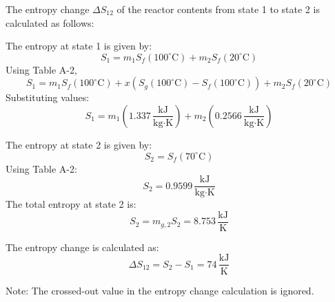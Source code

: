 The entropy change \( \Delta S_{12} \) of the reactor contents from state 1 to state 2 is calculated as follows:

The entropy at state 1 is given by:  
\[
S_1 = m_1 S_f(100^\circ\text{C}) + m_2 S_f(20^\circ\text{C})
\]  
Using Table A-2,  
\[
S_1 = m_1 S_f(100^\circ\text{C}) + x(S_g(100^\circ\text{C}) - S_f(100^\circ\text{C})) + m_2 S_f(20^\circ\text{C})
\]  
Substituting values:  
\[
S_1 = m_1 (1.337 \, \frac{\text{kJ}}{\text{kg·K}}) + m_2 (0.2566 \, \frac{\text{kJ}}{\text{kg·K}})
\]  

The entropy at state 2 is given by:  
\[
S_2 = S_f(70^\circ\text{C})
\]  
Using Table A-2:  
\[
S_2 = 0.9599 \, \frac{\text{kJ}}{\text{kg·K}}
\]  
The total entropy at state 2 is:  
\[
S_2 = m_{g,2} S_2 = 8.753 \, \frac{\text{kJ}}{\text{K}}
\]  

The entropy change is calculated as:  
\[
\Delta S_{12} = S_2 - S_1 = 74 \, \frac{\text{kJ}}{\text{K}}
\]  

Note: The crossed-out value in the entropy change calculation is ignored.
